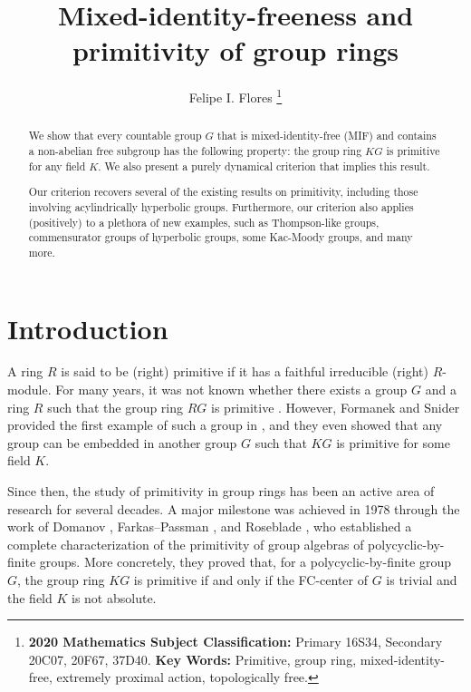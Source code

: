 \documentclass[11pt]{article}
\date{}
\theoremstyle{definition}
\theoremstyle{remark}
\numberwithin{equation}{section}
\numberwithin{equation}{section}
\numberwithin{equation}{section}
\begin{document}
\title{Mixed-identity-freeness and primitivity of group rings}


\author{Felipe I. Flores
\footnote{
\textbf{2020 Mathematics Subject Classification:} Primary 16S34, Secondary 20C07, 20F67, 37D40.
\newline
\textbf{Key Words:} Primitive, group ring, mixed-identity-free, extremely proximal action, topologically free.}
}

\maketitle


\begin{abstract}\setlength{\parindent}{0pt}\setlength{\parskip}{1ex}\noindent
We show that every countable group $G$ that is mixed-identity-free (MIF) and contains a non-abelian free subgroup has the following property: the group ring $KG$ is primitive for any field $K$. We also present a purely dynamical criterion that implies this result.  

Our criterion recovers several of the existing results on primitivity, including those involving acylindrically hyperbolic groups. Furthermore, our criterion also applies (positively) to a plethora of new examples, such as Thompson-like groups, commensurator groups of hyperbolic groups, some Kac-Moody groups, and many more.

\end{abstract}



\section{Introduction}

A ring $R$ is said to be (right) primitive if it has a faithful irreducible (right) $R$-module. For many years, it was not known whether there exists a group $G$ and a ring $R$ such that the group ring $RG$ is primitive \cite[Problem 17]{Ka70}. However, Formanek and Snider provided the first example of such a group in \cite{FoSn72}, and they even showed that any group can be embedded in another group $G$ such that $KG$ is primitive for some field $K$.

Since then, the study of primitivity in group rings has been an active area of research for several decades. A major milestone was achieved in 1978 through the work of Domanov \cite{Do78}, Farkas–Passman \cite{FaPa78}, and Roseblade \cite{Ro78,Ro79}, who established a complete characterization of the primitivity of group algebras of polycyclic-by-finite groups. More concretely, they proved that, for a polycyclic-by-finite group $G$, the group ring $KG$ is primitive if and only if the FC-center of $G$ is trivial and the field $K$ is not absolute.
\end{document}
